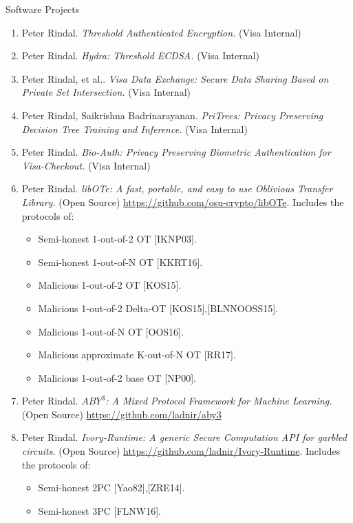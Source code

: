 \documentclass{resume} %
\begin{document}
\begin{rSection}{Software Projects}
	
	
	\begin{enumerate}[label=S\arabic* --]
		
		\item Peter Rindal. \emph{Threshold Authenticated Encryption.} (Visa Internal)
				
		\item Peter Rindal. \emph{Hydra: Threshold ECDSA.} (Visa Internal)
		
		\item Peter Rindal, et al.. \emph{Visa Data Exchange: Secure Data Sharing Based on Private Set Intersection.} (Visa Internal)
		
		\item Peter Rindal, Saikrishna Badrinarayanan. \emph{PriTrees: Privacy Preserving Decision Tree Training and Inference.} (Visa Internal)
		
		\item Peter Rindal. \emph{Bio-Auth: Privacy Preserving Biometric Authentication for Visa-Checkout.} (Visa Internal)
		
		\item Peter Rindal. \emph{libOTe: A fast, portable, and easy to use Oblivious Transfer Library.}  (Open Source) \url{https://github.com/osu-crypto/libOTe}. Includes the protocols of:
		\begin{itemize}
			\item Semi-honest 1-out-of-2 OT [IKNP03]. 
			\item Semi-honest 1-out-of-N OT [KKRT16].
			\item Malicious 1-out-of-2 OT [KOS15].
			\item Malicious 1-out-of-2 Delta-OT [KOS15],[BLNNOOSS15].
			\item Malicious 1-out-of-N OT [OOS16].
			\item Malicious approximate K-out-of-N OT [RR17].
			\item Malicious 1-out-of-2 base OT [NP00].
			
		\end{itemize}
	
	
		\item  Peter Rindal. \emph{$ABY^3$: A Mixed Protocol Framework for Machine Learning.} (Open Source)  \url{https://github.com/ladnir/aby3}
	
		\item Peter Rindal. \emph{Ivory-Runtime: A generic Secure Computation API for garbled circuits.} (Open Source)  \url{https://github.com/ladnir/Ivory-Runtime}. Includes the protocols of:
		\begin{itemize}
			\item Semi-honest 2PC [Yao82],[ZRE14].
			\item Semi-honest 3PC [FLNW16].
		\end{itemize}
		

\end{enumerate}
\end{rSection}
\end{document}
